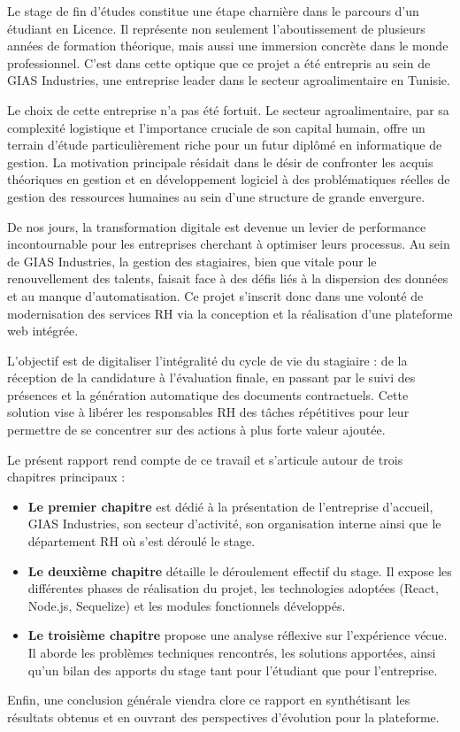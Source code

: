 Le stage de fin d'études constitue une étape charnière dans le parcours d'un étudiant en Licence. Il représente non seulement l'aboutissement de plusieurs années de formation théorique, mais aussi une immersion concrète dans le monde professionnel. C'est dans cette optique que ce projet a été entrepris au sein de GIAS Industries, une entreprise leader dans le secteur agroalimentaire en Tunisie.

Le choix de cette entreprise n'a pas été fortuit. Le secteur agroalimentaire, par sa complexité logistique et l'importance cruciale de son capital humain, offre un terrain d'étude particulièrement riche pour un futur diplômé en informatique de gestion. La motivation principale résidait dans le désir de confronter les acquis théoriques en gestion et en développement logiciel à des problématiques réelles de gestion des ressources humaines au sein d'une structure de grande envergure.

\vspace{1cm}

De nos jours, la transformation digitale est devenue un levier de performance incontournable pour les entreprises cherchant à optimiser leurs processus. Au sein de GIAS Industries, la gestion des stagiaires, bien que vitale pour le renouvellement des talents, faisait face à des défis liés à la dispersion des données et au manque d'automatisation. Ce projet s'inscrit donc dans une volonté de modernisation des services RH via la conception et la réalisation d'une plateforme web intégrée.

L'objectif est de digitaliser l'intégralité du cycle de vie du stagiaire : de la réception de la candidature à l'évaluation finale, en passant par le suivi des présences et la génération automatique des documents contractuels. Cette solution vise à libérer les responsables RH des tâches répétitives pour leur permettre de se concentrer sur des actions à plus forte valeur ajoutée.

\vspace{1cm}

Le présent rapport rend compte de ce travail et s'articule autour de trois chapitres principaux :

\begin{itemize}
    \item \textbf{Le premier chapitre} est dédié à la présentation de l'entreprise d'accueil, GIAS Industries, son secteur d'activité, son organisation interne ainsi que le département RH où s'est déroulé le stage.
    \item \textbf{Le deuxième chapitre} détaille le déroulement effectif du stage. Il expose les différentes phases de réalisation du projet, les technologies adoptées (React, Node.js, Sequelize) et les modules fonctionnels développés.
    \item \textbf{Le troisième chapitre} propose une analyse réflexive sur l'expérience vécue. Il aborde les problèmes techniques rencontrés, les solutions apportées, ainsi qu'un bilan des apports du stage tant pour l'étudiant que pour l'entreprise.
\end{itemize}

Enfin, une conclusion générale viendra clore ce rapport en synthétisant les résultats obtenus et en ouvrant des perspectives d'évolution pour la plateforme.
